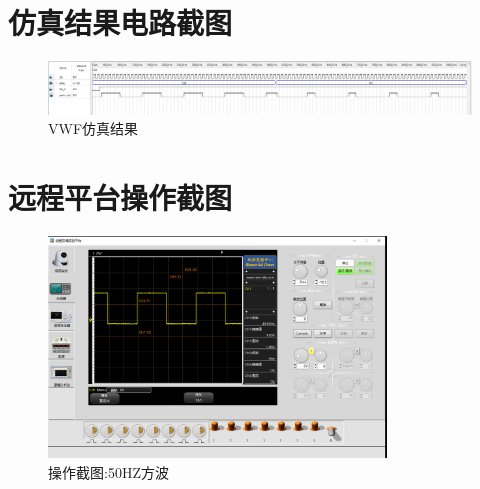 \documentclass[12pt,hyperref,a4paper,UTF8]{ctexart}
\begin{document}
\section{仿真结果电路截图}

\begin{figure}[H]
    \centering
    \begin{minipage}{1\textwidth}
        \centering
        \includegraphics[width=1\textwidth]{figures/601.png}
        \caption{VWF仿真结果}
        \label{fig:system_block_diagram}
    \end{minipage}
\end{figure}

\section{远程平台操作截图}


\begin{figure}[H]
    \centering
    \begin{minipage}{0.8\textwidth}
        \centering
        \includegraphics[width=0.8\textwidth]{figures/501.png}
        \caption{操作截图:50HZ方波}
        \label{fig:system_block_diagram}
    \end{minipage}
\end{figure}
\end{document}
